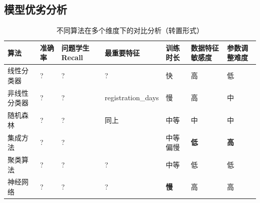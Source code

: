 \documentclass{SYSUReport}
\begin{document}
\subsection{模型优劣分析}
\begin{landscape}
\begin{table}[h]
\centering
\caption{不同算法在多个维度下的对比分析（转置形式）}
\renewcommand{\arraystretch}{1.3}
\begin{tabular}{>{\raggedright\arraybackslash}p{3.5cm} 
                >{\centering\arraybackslash}p{2cm}
                >{\centering\arraybackslash}p{2.5cm}
                >{\centering\arraybackslash}p{2cm}
                >{\centering\arraybackslash}p{3.2cm}
                >{\centering\arraybackslash}p{2.2cm}
                >{\centering\arraybackslash}p{2cm}}
\toprule
算法 & 准确率 & 问题学生Recall & 最重要特征 & 训练时长 & 数据特征敏感度 & 参数调整难度 \\
\midrule

线性分类器 &
? &
? &
? &
快 &
高 &
低 \\

非线性分类器 &
? &
? &
registration\_days &
慢 &
高 &
中 \\

随机森林 &
? &
? &
同上 &
中等 &
中 &
中 \\

集成方法 &
? &
? &
 &
中等偏慢 &
\textbf{低} &
\textbf{高} \\

聚类算法 &
? &
? &
? &
中等 &
低 &
低 \\

神经网络 &
? &
? &
? &
\textbf{慢} &
高 &
高 \\
\bottomrule
\end{tabular}
\label{tab:algorithm_comparison_rotated}
\end{table}
\end{landscape}






\newpage


\end{document}

